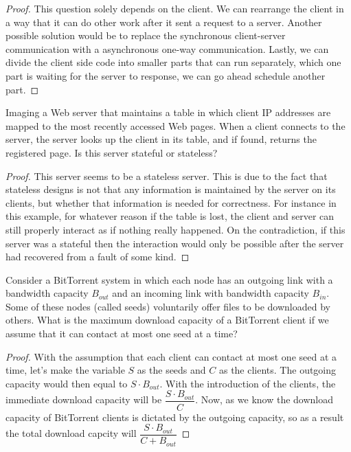 \documentclass[12pt]{article}
\newenvironment{exercise}[2][Exercise]{\begin{trivlist}
\item[\hskip \labelsep {\bfseries #1}\hskip \labelsep {\bfseries #2.}]}{\end{trivlist}}
\begin{document}
\begin{proof}
This question solely depends on the client. We can rearrange the client in a way that it can do other work after it sent a request to a server. Another possible solution would be to replace the synchronous client-server communication with a asynchronous one-way communication. Lastly, we can divide the client side code into smaller parts that can run separately, which one part is waiting for the server to response, we can go ahead schedule another part.
\end{proof}
 
\begin{exercise}{4}
Imaging a Web server that maintains a table in which client IP addresses are mapped to the most recently accessed Web pages. When a client connects to the server, the server looks up the client in its table, and if found, returns the registered page. Is this server stateful or stateless? 
\end{exercise}

\begin{proof}
This server seems to be a stateless server. This is due to the fact that stateless designs is not that any information is maintained by the server on its clients, but whether that information is needed for correctness. For instance in this example, for whatever reason if the table is lost, the client and server can still properly interact as if nothing really happened. On the contradiction, if this server was a stateful then the interaction would only be possible after the server had recovered from a fault of some kind.
\end{proof}

\begin{exercise}{5}
Consider a BitTorrent system in which each node has an outgoing link with a bandwidth capacity $B_{out}$ and an incoming link with bandwidth capacity $B_{in}$. Some of these nodes (called seeds) voluntarily offer files to be downloaded by others. What is the maximum download capacity of a BitTorrent client if we assume that it can contact at most one seed at a time?
\end{exercise}

\begin{proof}
With the assumption that each client can contact at most one seed at a time, let's make the variable $S$ as the seeds and $C$ as the clients. The outgoing capacity would then equal to $S \cdot B_{out}$. With the introduction of the clients, the immediate download capacity will be $\dfrac{S \cdot B_{out}}{C}$. Now, as we know the download capacity of BitTorrent clients is dictated by the outgoing capacity, so as a result the total download capcity will $\dfrac{S \cdot B_{out}}{C+B_{out}}$
\end{proof}
\end{document}
